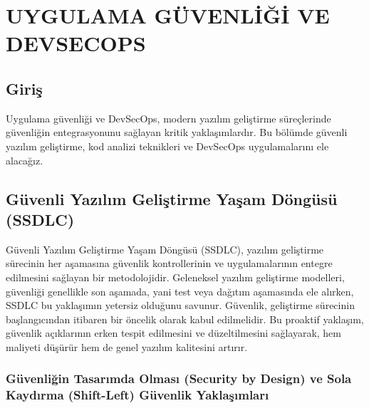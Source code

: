 ﻿\chapter{UYGULAMA GÜVENLİĞİ VE DEVSECOPS}

\section*{Giriş}
Uygulama güvenliği ve DevSecOps, modern yazılım geliştirme süreçlerinde güvenliğin entegrasyonunu sağlayan kritik yaklaşımlardır. Bu bölümde güvenli yazılım geliştirme, kod analizi teknikleri ve DevSecOps uygulamalarını ele alacağız.

\section{Güvenli Yazılım Geliştirme Yaşam Döngüsü (SSDLC)}

Güvenli Yazılım Geliştirme Yaşam Döngüsü (SSDLC), yazılım geliştirme sürecinin her aşamasına güvenlik kontrollerinin ve uygulamalarının entegre edilmesini sağlayan bir metodolojidir. Geleneksel yazılım geliştirme modelleri, güvenliği genellikle son aşamada, yani test veya dağıtım aşamasında ele alırken, SSDLC bu yaklaşımın yetersiz olduğunu savunur. Güvenlik, geliştirme sürecinin başlangıcından itibaren bir öncelik olarak kabul edilmelidir. Bu proaktif yaklaşım, güvenlik açıklarının erken tespit edilmesini ve düzeltilmesini sağlayarak, hem maliyeti düşürür hem de genel yazılım kalitesini artırır.

\subsection{Güvenliğin Tasarımda Olması (Security by Design) ve Sola Kaydırma (Shift-Left) Güvenlik Yaklaşımları}

